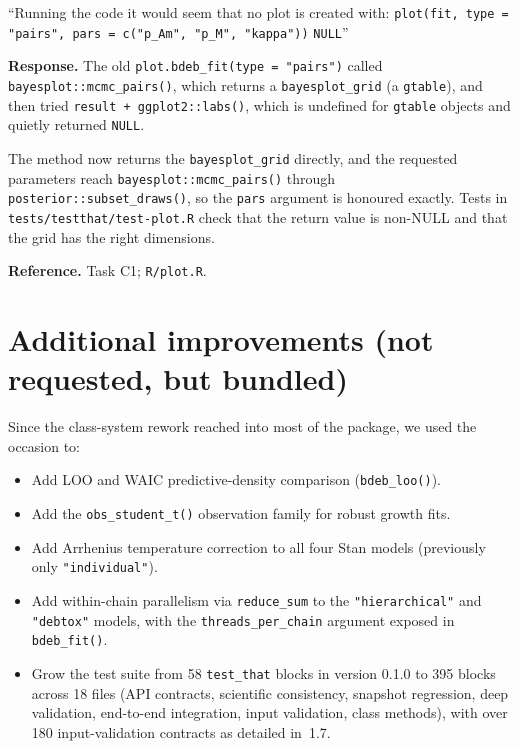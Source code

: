 \documentclass[11pt,a4paper]{article}
\newcommand{\code}[1]{\texttt{#1}}
\begin{document}
\begin{displayquote}
``Running the code it would seem that no plot is created with:
\verb|plot(fit, type = "pairs", pars = c("p_Am", "p_M", "kappa"))|
\code{NULL}''
\end{displayquote}

\textbf{Response.} The old \verb|plot.bdeb_fit(type = "pairs")| called
\code{bayesplot::mcmc\_pairs()}, which returns a \code{bayesplot\_grid}
(a \code{gtable}), and then tried \verb|result + ggplot2::labs()|, which
is undefined for \code{gtable} objects and quietly returned \code{NULL}.

The method now returns the \code{bayesplot\_grid} directly, and the
requested parameters reach \code{bayesplot::mcmc\_pairs()} through
\code{posterior::subset\_draws()}, so the \code{pars} argument is honoured
exactly. Tests in \code{tests/testthat/test-plot.R} check that the return
value is non-NULL and that the grid has the right dimensions.

\textbf{Reference.} Task C1; \code{R/plot.R}.

\section{Additional improvements (not requested, but bundled)}

Since the class-system rework reached into most of the package, we used
the occasion to:

\begin{itemize}[nosep]
\item Add LOO and WAIC predictive-density comparison
  (\code{bdeb\_loo()}).
\item Add the \code{obs\_student\_t()} observation family for robust
  growth fits.
\item Add Arrhenius temperature correction to all four Stan models
  (previously only \verb|"individual"|).
\item Add within-chain parallelism via \code{reduce\_sum} to the
  \verb|"hierarchical"| and \verb|"debtox"| models, with the
  \code{threads\_per\_chain} argument exposed in \code{bdeb\_fit()}.
\item Grow the test suite from 58 \code{test\_that} blocks in version
  0.1.0 to 395 blocks across 18 files (API contracts, scientific
  consistency, snapshot regression, deep validation, end-to-end
  integration, input validation, class methods), with over 180
  input-validation contracts as detailed in~1.7.
\end{itemize}
\end{document}
